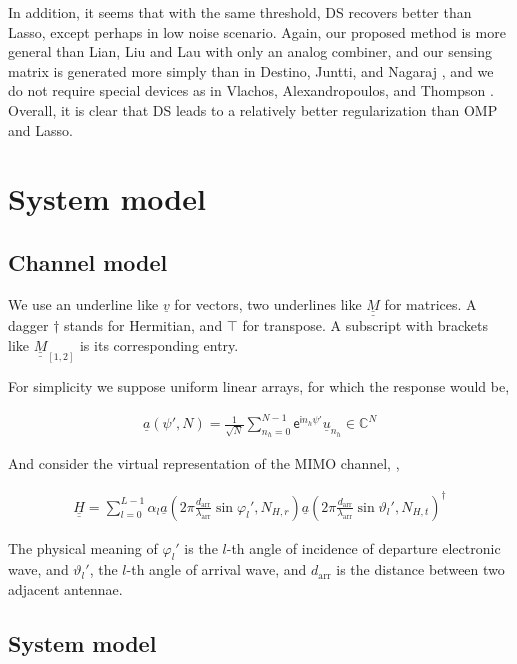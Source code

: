 \documentclass[journal]{IEEEtran}
\renewcommand {\a} {\alpha}
\newcommand {\f} {\varphi}
\renewcommand {\l} {\lambda}
\renewcommand {\th} {\vartheta}
\newcommand {\m} [1] {\( #1 \)}
\newcommand {\V} [1] {\underline {#1}}
\newcommand {\M} [1] {\underline {\underline {#1}}}
\newcommand {\RB} [1] {\left( #1 \right)}
\newcommand {\SB} [1] {\left[ #1 \right]}
\newcommand {\R} [1] {\sqrt {#1}}
\newcommand {\Disp} [1] {
   \begin {align*}
      #1
   \end {align*}
}
\begin{document}
In addition, it seems that with the same threshold, DS recovers better than Lasso, except perhaps in low noise scenario.
Again, our proposed method is more general than Lian, Liu and Lau \cite {LLL17} with only an analog combiner,
and our sensing matrix is generated more simply than in Destino, Juntti, and Nagaraj \cite {DJN15},
and we do not require special devices as in Vlachos, Alexandropoulos, and Thompson \cite {VAT19}.
Overall, it is clear that DS leads to a relatively better regularization than OMP and Lasso.


\section{System model}

\subsection {Channel model}

We use an underline like \m {\V {v}} for vectors, two underlines like \m {\M {M}} for matrices.
A dagger \m {\dagger} stands for Hermitian, and \m {\intercal} for transpose.
A subscript with brackets like \m {\M {M} _{\SB{1,2}}} is its corresponding entry.

For simplicity we suppose uniform linear arrays, for which the response would be,
\Disp {
\V {a} \RB {\psi', N}
= \frac {1} {\R {N}} \sum_{n_h=0}^{N-1} \mathsf {e} ^{\mathsf {i} n_h \psi'} \V {u} _{n_h}
\in \mathbb {C} ^ {N} 
}
And consider the virtual representation of the MIMO channel, \cite {ALS14},
\Disp {
\M {H}
=\sum_{l=0} ^{L-1}
\a_l
\V {a} \RB { 2\pi \frac {d_{\mathrm {arr}}} {\l _{\mathrm {arr}}} \sin \f_l', N_{H,r}}
\V {a} \RB { 2\pi \frac {d_{\mathrm {arr}}} {\l _{\mathrm {arr}}} \sin \th_l', N_{H,t}}^\dagger 
}
The physical meaning of \m {\f_l'} is the \m {l}-th angle of incidence of departure electronic wave, and \m {\th_l'}, the \m {l}-th angle of arrival wave, and \m {d_{\mathrm {arr}}} is the distance between two adjacent antennae.

\subsection {System model}
\end{document}
